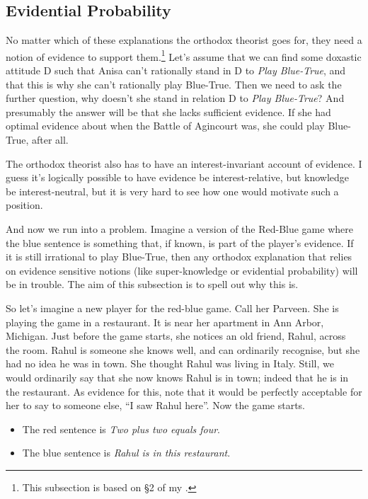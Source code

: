 \documentclass[
  11pt,
]{book}
\providecommand{\tightlist}{%
  \setlength{\itemsep}{0pt}\setlength{\parskip}{0pt}}
\begin{document}
\hypertarget{orthodoxevidence}{%
\subsection{Evidential Probability}\label{orthodoxevidence}}

No matter which of these explanations the orthodox theorist goes for, they need a notion of evidence to support them.\footnote{This subsection is based on §2 of my \citeyearpar{Weatherson2018-WEAIEA-2}.} Let's assume that we can find some doxastic attitude D such that Anisa can't rationally stand in D to \emph{Play Blue-True}, and that this is why she can't rationally play Blue-True. Then we need to ask the further question, why doesn't she stand in relation D to \emph{Play Blue-True}? And presumably the answer will be that she lacks sufficient evidence. If she had optimal evidence about when the Battle of Agincourt was, she could play Blue-True, after all.

The orthodox theorist also has to have an interest-invariant account of evidence. I guess it's logically possible to have evidence be interest-relative, but knowledge be interest-neutral, but it is very hard to see how one would motivate such a position.

And now we run into a problem. Imagine a version of the Red-Blue game where the blue sentence is something that, if known, is part of the player's evidence. If it is still irrational to play Blue-True, then any orthodox explanation that relies on evidence sensitive notions (like super-knowledge or evidential probability) will be in trouble. The aim of this subsection is to spell out why this is.

So let's imagine a new player for the red-blue game. Call her Parveen. She is playing the game in a restaurant. It is near her apartment in Ann Arbor, Michigan. Just before the game starts, she notices an old friend, Rahul, across the room. Rahul is someone she knows well, and can ordinarily recognise, but she had no idea he was in town. She thought Rahul was living in Italy. Still, we would ordinarily say that she now knows Rahul is in town; indeed that he is in the restaurant. As evidence for this, note that it would be perfectly acceptable for her to say to someone else, ``I saw Rahul here''. Now the game starts.

\begin{itemize}
\tightlist
\item
  The red sentence is \emph{Two plus two equals four}.
\item
  The blue sentence is \emph{Rahul is in this restaurant}.
\end{itemize}
\end{document}
